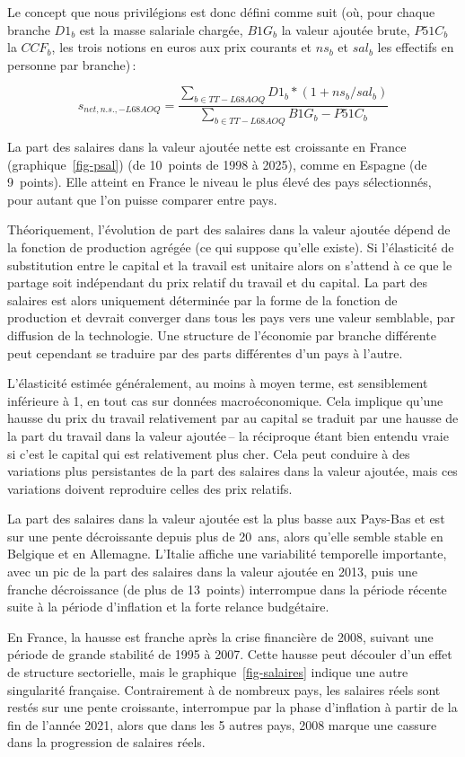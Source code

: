 \documentclass[
  french,
  9pt,
  a4paper,
]{article}
\begin{document}
Le concept que nous privilégions est donc défini comme suit (où, pour
chaque branche \(D1_b\) est la masse salariale chargée, \(B1G_b\) la
valeur ajoutée brute, \(P51C_b\) la \(CCF_b\), les trois notions en
euros aux prix courants et \(ns_b\) et \(sal_b\) les effectifs en
personne par branche)\,:

\[
s_{net, n.s., -L68AOQ}  = \frac{\sum_{b\in{TT-L68AOQ}}{D1_b*(1+ns_b/sal_b)}}{\sum_{b\in{TT-L68AOQ}}{B1G_b - P51C_b}}
\]

La part des salaires dans la valeur ajoutée nette est croissante en
France (graphique~\ref{fig-psal}) (de 10~points de 1998 à 2025), comme
en Espagne (de 9~points). Elle atteint en France le niveau le plus élevé
des pays sélectionnés, pour autant que l'on puisse comparer entre pays.

Théoriquement, l'évolution de part des salaires dans la valeur ajoutée
dépend de la fonction de production agrégée (ce qui suppose qu'elle
existe). Si l'élasticité de substitution entre le capital et la travail
est unitaire alors on s'attend à ce que le partage soit indépendant du
prix relatif du travail et du capital. La part des salaires est alors
uniquement déterminée par la forme de la fonction de production et
devrait converger dans tous les pays vers une valeur semblable, par
diffusion de la technologie. Une structure de l'économie par branche
différente peut cependant se traduire par des parts différentes d'un
pays à l'autre.

L'élasticité estimée généralement, au moins à moyen terme, est
sensiblement inférieure à 1, en tout cas sur données macroéconomique.
Cela implique qu'une hausse du prix du travail relativement par au
capital se traduit par une hausse de la part du travail dans la valeur
ajoutée\,-- la réciproque étant bien entendu vraie si c'est le capital
qui est relativement plus cher. Cela peut conduire à des variations plus
persistantes de la part des salaires dans la valeur ajoutée, mais ces
variations doivent reproduire celles des prix relatifs.

La part des salaires dans la valeur ajoutée est la plus basse aux
Pays-Bas et est sur une pente décroissante depuis plus de 20~ans, alors
qu'elle semble stable en Belgique et en Allemagne. L'Italie affiche une
variabilité temporelle importante, avec un pic de la part des salaires
dans la valeur ajoutée en 2013, puis une franche décroissance (de plus
de 13~points) interrompue dans la période récente suite à la période
d'inflation et la forte relance budgétaire.

En France, la hausse est franche après la crise financière de 2008,
suivant une période de grande stabilité de 1995 à 2007. Cette hausse
peut découler d'un effet de structure sectorielle, mais le
graphique~\ref{fig-salaires} indique une autre singularité française.
Contrairement à de nombreux pays, les salaires réels sont restés sur une
pente croissante, interrompue par la phase d'inflation à partir de la
fin de l'année 2021, alors que dans les 5 autres pays, 2008 marque une
cassure dans la progression de salaires réels.
\end{document}
